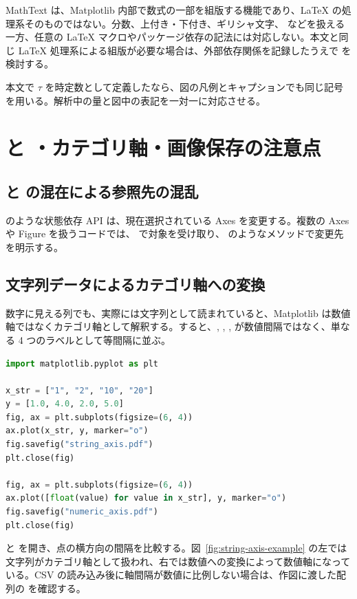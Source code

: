 MathText は、Matplotlib 内部で数式の一部を組版する機能であり、LaTeX の処理系そのものではない。分数、上付き・下付き、ギリシャ文字、 などを扱える一方、任意の LaTeX マクロやパッケージ依存の記法には対応しない。本文と同じ LaTeX 処理系による組版が必要な場合は、外部依存関係を記録したうえで  を検討する。

本文で $\tau$ を時定数として定義したなら、図の凡例とキャプションでも同じ記号を用いる。解析中の量と図中の表記を一対一に対応させる。


\section{ と ・カテゴリ軸・画像保存の注意点}

\subsection{ と  の混在による参照先の混乱}

 のような状態依存 API は、現在選択されている Axes を変更する。複数の Axes や Figure を扱うコードでは、 で対象を受け取り、 のようなメソッドで変更先を明示する。

\subsection{文字列データによるカテゴリ軸への変換}

数字に見える列でも、実際には文字列として読まれていると、Matplotlib は数値軸ではなくカテゴリ軸として解釈する。すると、, , ,  が数値間隔ではなく、単なる 4 つのラベルとして等間隔に並ぶ。

\begin{lstlisting}[language=Python]
import matplotlib.pyplot as plt

x_str = ["1", "2", "10", "20"]
y = [1.0, 4.0, 2.0, 5.0]
fig, ax = plt.subplots(figsize=(6, 4))
ax.plot(x_str, y, marker="o")
fig.savefig("string_axis.pdf")
plt.close(fig)

fig, ax = plt.subplots(figsize=(6, 4))
ax.plot([float(value) for value in x_str], y, marker="o")
fig.savefig("numeric_axis.pdf")
plt.close(fig)
\end{lstlisting}

 と  を開き、点の横方向の間隔を比較する。図~\ref{fig:string-axis-example} の左では文字列がカテゴリ軸として扱われ、右では数値への変換によって数値軸になっている。CSV の読み込み後に軸間隔が数値に比例しない場合は、作図に渡した配列の  を確認する。

